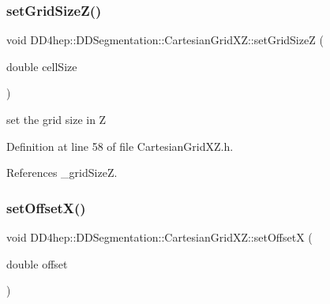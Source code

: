 \hypertarget{class_d_d4hep_1_1_d_d_segmentation_1_1_cartesian_grid_x_z_aaef2c9c85c9d1325ab98690f33793ce1}{}\label{class_d_d4hep_1_1_d_d_segmentation_1_1_cartesian_grid_x_z_aaef2c9c85c9d1325ab98690f33793ce1} 
\subsubsection{\texorpdfstring{set\+Grid\+Size\+Z()}{setGridSizeZ()}}
{\footnotesize\ttfamily void D\+D4hep\+::\+D\+D\+Segmentation\+::\+Cartesian\+Grid\+X\+Z\+::set\+Grid\+SizeZ (\begin{DoxyParamCaption}\item[{double}]{cell\+Size }\end{DoxyParamCaption})\hspace{0.3cm}{\ttfamily [inline]}}



set the grid size in Z 



Definition at line 58 of file Cartesian\+Grid\+X\+Z.\+h.



References \+\_\+grid\+SizeZ.

\hypertarget{class_d_d4hep_1_1_d_d_segmentation_1_1_cartesian_grid_x_z_abc7142a9cda0a6eb682d4eea9e5eae7a}{}\label{class_d_d4hep_1_1_d_d_segmentation_1_1_cartesian_grid_x_z_abc7142a9cda0a6eb682d4eea9e5eae7a} 
\subsubsection{\texorpdfstring{set\+Offset\+X()}{setOffsetX()}}
{\footnotesize\ttfamily void D\+D4hep\+::\+D\+D\+Segmentation\+::\+Cartesian\+Grid\+X\+Z\+::set\+OffsetX (\begin{DoxyParamCaption}\item[{double}]{offset }\end{DoxyParamCaption})\hspace{0.3cm}{\ttfamily [inline]}}



